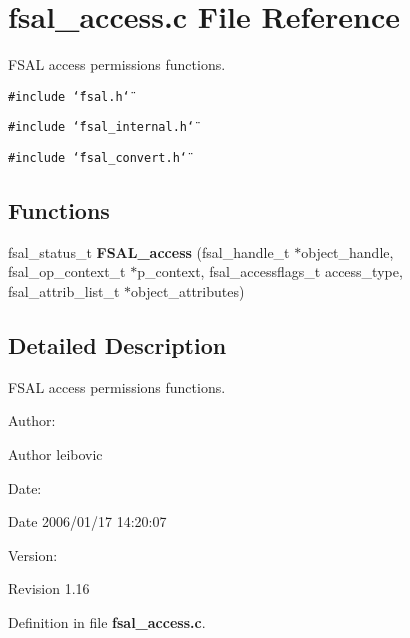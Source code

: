 \section{fsal\_\-access.c File Reference}
\label{fsal__access_8c}
FSAL access permissions functions.  


{\tt \#include \char`\"{}fsal.h\char`\"{}}\par
{\tt \#include \char`\"{}fsal\_\-internal.h\char`\"{}}\par
{\tt \#include \char`\"{}fsal\_\-convert.h\char`\"{}}\par
\subsection*{Functions}
\begin{CompactItemize}
\item 
fsal\_\-status\_\-t {\bf FSAL\_\-access} (fsal\_\-handle\_\-t $\ast$object\_\-handle, fsal\_\-op\_\-context\_\-t $\ast$p\_\-context, fsal\_\-accessflags\_\-t access\_\-type, fsal\_\-attrib\_\-list\_\-t $\ast$object\_\-attributes)
\end{CompactItemize}


\subsection{Detailed Description}
FSAL access permissions functions. 

\begin{Desc}
\item[Author:]\end{Desc}
\begin{Desc}
\item[Author]leibovic \end{Desc}
\begin{Desc}
\item[Date:]\end{Desc}
\begin{Desc}
\item[Date]2006/01/17 14:20:07 \end{Desc}
\begin{Desc}
\item[Version:]\end{Desc}
\begin{Desc}
\item[Revision]1.16 \end{Desc}


Definition in file {\bf fsal\_\-access.c}.

